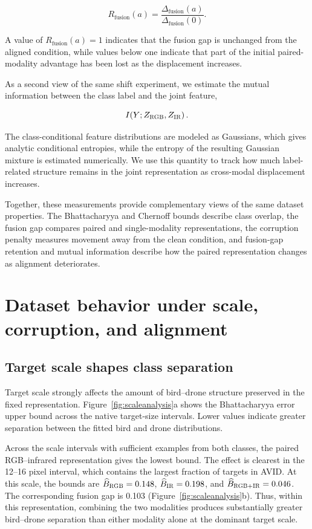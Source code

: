\documentclass[10pt]{article}
\newcommand{\dataset}{\textsc{AVID}}
\newcommand{\rgb}{\textsc{RGB}}
\newcommand{\ir}{\textsc{IR}}
\newcommand{\Bhat}{\widehat B}
\newcommand{\bfg}{\Delta_{\mathrm{fusion}}}
\begin{document}
\begin{equation}
R_{\mathrm{fusion}}(a)
=
\frac{\bfg(a)}
{\bfg(0)}.
\label{eq:retention}
\end{equation}

A value of $R_{\mathrm{fusion}}(a)=1$ indicates that the fusion gap is unchanged from the aligned condition, while values below one indicate that part of the initial paired-modality advantage has been lost as the displacement increases.

As a second view of the same shift experiment, we estimate the mutual information between the class label and the joint feature,

\begin{equation}
I\!\left(Y;Z_{\rgb},Z_{\ir}\right).
\end{equation}

The class-conditional feature distributions are modeled as Gaussians, which gives analytic conditional entropies, while the entropy of the resulting Gaussian mixture is estimated numerically. We use this quantity to track how much label-related structure remains in the joint representation as cross-modal displacement increases.

Together, these measurements provide complementary views of the same dataset properties. The Bhattacharyya and Chernoff bounds describe class overlap, the fusion gap compares paired and single-modality representations, the corruption penalty measures movement away from the clean condition, and fusion-gap retention and mutual information describe how the paired representation changes as alignment deteriorates.


\section{Dataset behavior under scale, corruption, and alignment}
\label{sec:findings}

\subsection{Target scale shapes class separation}

Target scale strongly affects the amount of bird--drone structure preserved in the fixed representation. Figure~\ref{fig:scaleanalysis}a shows the Bhattacharyya error upper bound across the native target-size intervals. Lower values indicate greater separation between the fitted bird and drone distributions.

Across the scale intervals with sufficient examples from both classes, the paired RGB--infrared representation gives the lowest bound. The effect is clearest in the 12--16 pixel interval, which contains the largest fraction of targets in \dataset{}. At this scale, the bounds are
$\Bhat_{\rgb}=0.148$,
$\Bhat_{\ir}=0.198$, and
$\Bhat_{\rgb+\ir}=0.046$.
The corresponding fusion gap is 0.103 (Figure~\ref{fig:scaleanalysis}b). Thus, within this representation, combining the two modalities produces substantially greater bird--drone separation than either modality alone at the dominant target scale.
\end{document}
